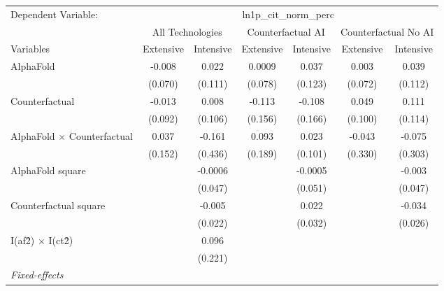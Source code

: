 \begingroup
\centering
\begin{tabular}{lcccccc}
   \tabularnewline \midrule \midrule
   Dependent Variable: & \multicolumn{6}{c}{ln1p\_cit\_norm\_perc}\\
 & \multicolumn{2}{c}{All Technologies} & \multicolumn{2}{c}{Counterfactual AI} & \multicolumn{2}{c}{Counterfactual No AI} \\
\cmidrule(lr){1-1}\cmidrule(lr){2-3} \cmidrule(lr){4-5} \cmidrule(lr){6-7}
Variables & \multicolumn{1}{c}{Extensive} & \multicolumn{1}{c}{Intensive} & \multicolumn{1}{c}{Extensive} & \multicolumn{1}{c}{Intensive} & \multicolumn{1}{c}{Extensive} & \multicolumn{1}{c}{Intensive} \\
\cmidrule(lr){1-1}\cmidrule(lr){2-2} \cmidrule(lr){3-3} \cmidrule(lr){4-4} \cmidrule(lr){5-5} \cmidrule(lr){6-6} \cmidrule(lr){7-7}
   AlphaFold                          & -0.008  & 0.022   & 0.0009  & 0.037   & 0.003   & 0.039\\   
                                      & (0.070) & (0.111) & (0.078) & (0.123) & (0.072) & (0.112)\\   
   Counterfactual                     & -0.013  & 0.008   & -0.113  & -0.108  & 0.049   & 0.111\\   
                                      & (0.092) & (0.106) & (0.156) & (0.166) & (0.100) & (0.114)\\   
   AlphaFold $\times$ Counterfactual  & 0.037   & -0.161  & 0.093   & 0.023   & -0.043  & -0.075\\   
                                      & (0.152) & (0.436) & (0.189) & (0.101) & (0.330) & (0.303)\\   
   AlphaFold square                   &         & -0.0006 &         & -0.0005 &         & -0.003\\   
                                      &         & (0.047) &         & (0.051) &         & (0.047)\\   
   Counterfactual square              &         & -0.005  &         & 0.022   &         & -0.034\\   
                                      &         & (0.022) &         & (0.032) &         & (0.026)\\   
   I(af\^2) $\times$ I(ct\^2)         &         & 0.096   &         &         &         &   \\   
                                      &         & (0.221) &         &         &         &   \\   
   \midrule
   \emph{Fixed-effects}\\

\end{tabular}
